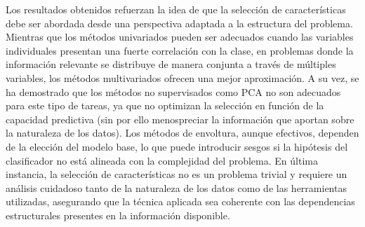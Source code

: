 \documentclass[a4paper,12pt]{article}
\begin{document}
Los resultados obtenidos refuerzan la idea de que la selección de características debe ser abordada desde una perspectiva adaptada a la estructura del problema. Mientras que los métodos univariados pueden ser adecuados cuando las variables individuales presentan una fuerte correlación con la clase, en problemas donde la información relevante se distribuye de manera conjunta a través de múltiples variables, los métodos multivariados ofrecen una mejor aproximación. A su vez, se ha demostrado que los métodos no supervisados como PCA no son adecuados para este tipo de tareas, ya que no optimizan la selección en función de la capacidad predictiva (sin por ello menospreciar la información que aportan sobre la naturaleza de los datos). Los métodos de envoltura, aunque efectivos, dependen de la elección del modelo base, lo que puede introducir sesgos si la hipótesis del clasificador no está alineada con la complejidad del problema. En última instancia, la selección de características no es un problema trivial y requiere un análisis cuidadoso tanto de la naturaleza de los datos como de las herramientas utilizadas, asegurando que la técnica aplicada sea coherente con las dependencias estructurales presentes en la información disponible.


\newpage
{}


\end{document}
